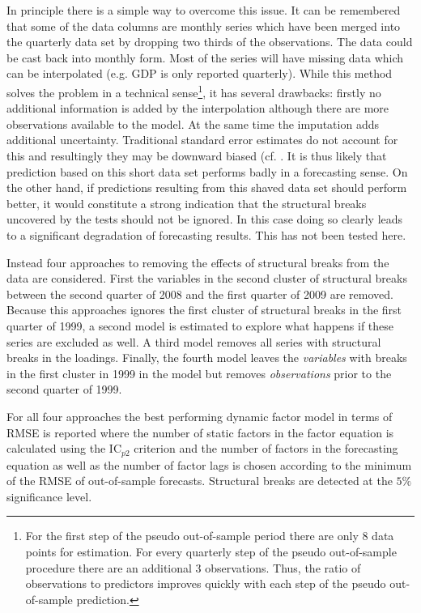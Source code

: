 \documentclass[12pt]{article}
\begin{document}
In principle there is a simple way to overcome this issue. It can be remembered that some of the data columns are monthly series which have been merged into the quarterly data set by dropping two thirds of the observations. The data could be cast back into monthly form. Most of the series will have missing data which can be interpolated (e.g. GDP is only reported quarterly). While this method solves the problem in a technical sense\footnote{For the first step of the pseudo out-of-sample period there are only $8$ data points for estimation. For every quarterly step of the pseudo out-of-sample procedure there are an additional $3$ observations. Thus, the ratio of observations to predictors improves quickly with each step of the pseudo out-of-sample prediction.}, it has several drawbacks: firstly no additional information is added by the interpolation although there are more observations available to the model. At the same time the imputation adds additional uncertainty. Traditional standard error estimates do not account for this and resultingly they may be downward biased (cf. \citet[chapter~25]{gelman2006missing}. It is thus likely that prediction based on this short data set performs badly in a forecasting sense. On the other hand, if predictions resulting from this shaved data set should perform better, it would constitute a strong indication that the structural breaks uncovered by the tests should not be ignored. In this case doing so clearly leads to a significant degradation of forecasting results. This has not been tested here. 

Instead four approaches to removing the effects of structural breaks from the data are considered. First the variables in the second cluster of structural breaks between the second quarter of 2008 and the first quarter of 2009 are removed. Because this approaches ignores the first cluster of structural breaks in the first quarter of 1999, a second model is estimated to explore what happens if these series are excluded as well. A third model removes all series with structural breaks in the loadings. Finally, the fourth model leaves the \textit{variables} with breaks in the first cluster in 1999 in the model but removes \textit{observations} prior to the second quarter of 1999. 

For all four approaches the best performing dynamic factor model in terms of RMSE is reported where the number of static factors in the factor equation is calculated using the IC$_{p2}$ criterion and the number of factors in the forecasting equation as well as the number of factor lags is chosen according to the minimum of the RMSE of out-of-sample forecasts. Structural breaks are detected at the $5\%$ significance level.
\end{document}
